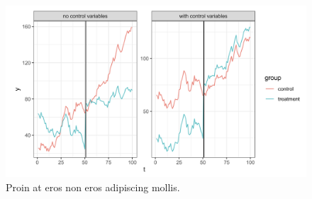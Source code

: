 


\newpage
\thispagestyle{empty}
\begin{landscape}
	\thispagestyle{empty}
	\begin{figure}[p]
		\centering
		\includegraphics[width = \linewidth, keepaspectratio]{figures/fig3.png}
		\caption[Lorem Ipsum]{Proin at eros non eros adipiscing mollis.}
		\label{fig:figura3}
	\end{figure}
\end{landscape}

